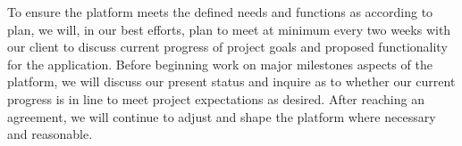 \documentclass[letterpaper, 10pt, draftclsnofoot, onecolumn]{IEEEtran}
\begin{document}
To ensure the platform meets the defined needs and functions as according to plan, 
we will, in our best efforts, plan to meet at minimum every two weeks with our client to 
discuss current progress of project goals and proposed functionality for the application. 
Before beginning work on major milestones aspects of the platform, we will discuss our present 
status and inquire as to whether our current progress is in line to meet project expectations as
desired. After reaching an agreement, we will continue to adjust and shape the platform where 
necessary and reasonable.
\end{document}
